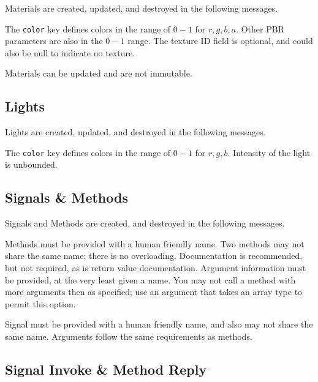 \documentclass[11pt, oneside]{amsart}
\begin{document}
Materials are created, updated, and destroyed in the following messages.



The \texttt{color} key defines colors in the range of $0 - 1$ for $r,g,b,a$. Other PBR parameters are also in the $0 - 1$ range. The texture ID field is optional, and could also be null to indicate no texture. 

Materials can be updated and are not immutable. 

\subsection{Lights}

 Lights are created, updated, and destroyed in the following messages.
 
 
 
 The \texttt{color} key defines colors in the range of $0 - 1$ for $r,g,b$. Intensity of the light is unbounded.


\subsection{Signals \& Methods}

Signals and Methods are created, and destroyed in the following messages.



Methods must be provided with a human friendly name. Two methods may not share the same name; there is no overloading. Documentation is recommended, but not required, as is return value documentation. Argument information must be provided, at the very least given a name. You may not call a method with more arguments then as specified; use an argument that takes an array type to permit this option.

Signal must be provided with a human friendly name, and also may not share the same name. Arguments follow the same requirements as methods.

\subsection{Signal Invoke \& Method Reply}
\end{document}

